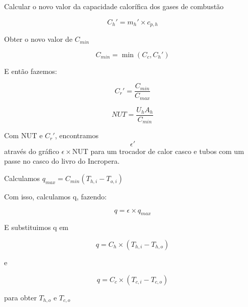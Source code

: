 Calcular o novo valor da capacidade calorífica dos gases de combustão

\[C_{h}' = m_{h}' \times c_{p,h}\]

Obter o novo valor de $C_{min}$

\[C_{min} = \min(C_{c},C_{h}')\]

E então fazemos:

\[C_{r}' = \frac{C_{min}}{C_{max}}\]

\[NUT = \frac{U_{h}A_{h}}{C_{min}}\]

Com NUT e $C_{r}'$, encontramos \[\epsilon'\] através do gráfico $\epsilon \times$NUT para um trocador de calor casco e tubos com um passe no casco do livro do Incropera.

Calculamos $q_{max} = C_{min} (T_{h,i}-T_{o,i})$

Com isso, calculamos q, fazendo:

\[q = \epsilon \times q_{max}\]


E substituimos q em

\[q = C_{h} \times (T_{h,i} - T_{h,o})\]

e 

\[q = C_{c} \times (T_{c,i} - T_{c,o})\]

para obter $T_{h,o}$ e $T_{c,o}$


\begin{figure}[h]
\begin{center}
\end{center}
\end{figure}